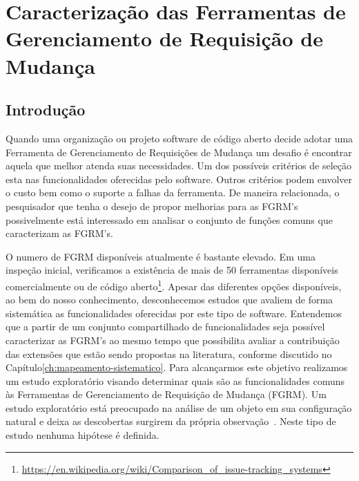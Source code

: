 \chapter{Caracterização das Ferramentas de Gerenciamento de Requisição de
	Mudança}
\label{ch:caracterizacao}


\section{Introdução}

Quando uma organização ou projeto software de código aberto decide adotar uma
Ferramenta de Gerenciamento de Requisições de Mudança um desafio é encontrar
aquela que melhor atenda suas necessidades. Um dos possíveis critérios de
seleção esta nas funcionalidades oferecidas pelo software. Outros critérios
podem envolver o custo bem como o suporte a falhas da ferramenta.  De maneira
relacionada, o pesquisador que tenha o desejo de propor melhorias para as FGRM's
possivelmente está interessado em analisar o conjunto de funções comuns que
caracterizam as FGRM's.

O numero de FGRM disponíveis atualmente é bastante elevado. Em uma inspeção
inicial, verificamos a existência de mais de 50 ferramentas disponíveis
comercialmente ou de código
aberto\footnote{\url{https://en.wikipedia.org/wiki/Comparison_of_issue-tracking_systems}}.
Apesar das diferentes opções disponíveis, ao bem do nosso conhecimento,
desconhecemos estudos que avaliem de forma sistemática as funcionalidades
oferecidas por este tipo de software. Entendemos que a partir de um conjunto
compartilhado de funcionalidades seja possível caracterizar as FGRM's ao mesmo
tempo que possibilita avaliar a contribuição das extensões que estão sendo
propostas na literatura, conforme discutido no
Capítulo\ref{ch:mapeamento-sistematico}.  Para alcançarmos este objetivo
realizamos um estudo exploratório visando determinar quais são as
funcionalidades comuns às Ferramentas de Gerenciamento de Requisição de Mudança
(FGRM). Um estudo exploratório está preocupado na análise de um objeto em sua
configuração natural e deixa as descobertas surgirem da própria
observação~\cite{wohlin2012experimentation}. Neste tipo de estudo nenhuma
hipótese é definida.

